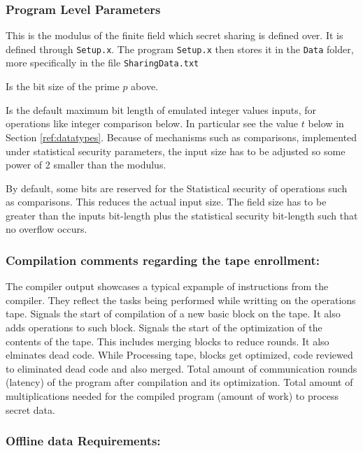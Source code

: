\subsubsection{Program Level Parameters}

This is the modulus of the finite field which secret sharing is defined over.
It is defined through \verb|Setup.x|. 
The program \verb+Setup.x+ then stores it in the \verb|Data| folder, more specifically in the file \verb|SharingData.txt|

Is the bit size of the prime $p$ above. 

Is the default maximum bit length of emulated integer values inputs,
for operations like integer comparison below. 
In particular see the value $t$ below in Section \ref{ref:datatypes}.
Because of mechanisms such as comparisons, implemented under statistical security parameters, the input size has to be adjusted so some power of 2 smaller than the modulus. 

By default, some bits are reserved for the Statistical security of operations such as comparisons. This reduces the actual input size.
The field size has to be greater than the inputs bit-length plus the statistical security bit-length such that no overflow occurs. 

\subsubsection{Compilation comments regarding the tape enrollment:} 
The compiler output showcases a typical expample of instructions from the compiler. They reflect the tasks being performed while writting on the operations tape.
Signals the start of compilation of a new basic block on the tape. It also adds operations to such block.
Signals the start of the optimization of the contents of the tape. This includes merging blocks to reduce rounds. It also elminates dead code.
While Processing tape, blocks get optimized, code reviewed to eliminated dead code and also merged.
Total amount of communication rounds (latency) of the program after compilation and its optimization.
Total amount of multiplications needed for the compiled program (amount of work) to process secret data.

\subsubsection{Offline data Requirements:} 

